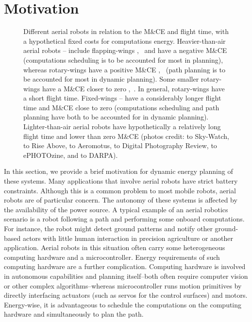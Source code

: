 \section{Motivation}
\label{sec:motivation}

\begin{figure}[t!]
  \centering
  \footnotesize{}\selectfont
  
  \caption[Different aerial robots in relation to the M\&CE and flight time]{Different aerial robots in relation to the M\&CE and flight time, with a hypothetical fixed costs for computations energy. Heavier-than-air aerial robots -- include flapping-wings ,~ and have a negative M\&CE (computations scheduling is to be accounted for most in planning), whereas rotary-wings have a positive M\&CE ,~ (path planning is to be accounted for most in dynamic planning). Some smaller rotary-wings have a M\&CE closer to zero ,~. In general, rotary-wings have a short flight time. Fixed-wings -- have a considerably longer flight time and M\&CE close to zero (computations scheduling and path planning have both to be accounted for in dynamic planning). Lighter-than-air aerial robots  have hypothetically a relatively long flight time and lower than zero M\&CE {\scriptsize(photos credit:  to Sky-Watch,  to Rise Above,  to Aeromotus,  to Digital Photography Review,  to ePHOTOzine, and  to DARPA)}.}
  \label{fig:plot10}
\end{figure}

In this section, we provide a brief motivation for dynamic energy planning of these systems.
Many applications that involve aerial robots have strict battery constraints. Although this is a common problem to most mobile robots, aerial robots are of particular concern. The autonomy of these systems is affected by the availability of the power source. A typical example of an aerial robotics scenario is a robot following a path and performing some onboard computations. For instance, the robot might detect ground patterns and notify other ground-based actors with little human interaction in precision agriculture or another application. Aerial robots in this situation often carry some heterogeneous computing hardware and a microcontroller. Energy requirements of such computing hardware are a further complication. Computing hardware is involved in autonomous capabilities and planning itself--both often require computer vision or other complex algorithms--whereas microcontroller runs motion primitives by directly interfacing actuators (such as servos for the control surfaces) and motors. Energy-wise, it is advantageous to schedule the computations on the computing hardware and simultaneously to plan the path.

